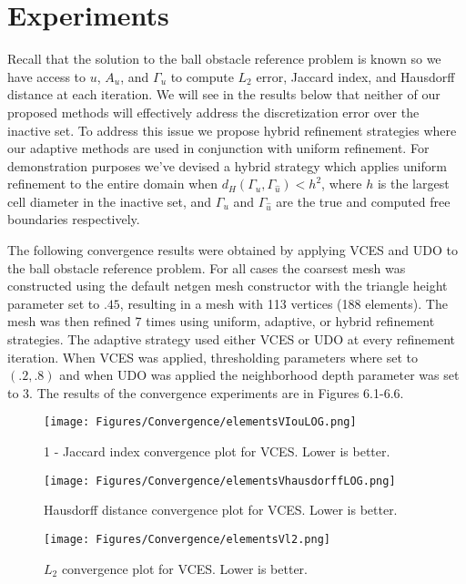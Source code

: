 \documentclass[12 pt]{report}
\begin{document}
\section{Experiments}
Recall that the solution to the ball obstacle reference problem is known so we have access to $u$, $A_u$, and $\Gamma_u$ to compute $L_2$ error, Jaccard index, and Hausdorff distance at each iteration. We will see in the results below that neither of our proposed methods will effectively address the discretization error over the inactive set. To address this issue we propose hybrid refinement strategies where our adaptive methods are used in conjunction with uniform refinement. For demonstration purposes we've devised a hybrid strategy which applies uniform refinement to the entire domain when $d_H(\Gamma_u, \Gamma_{\hat{u}}) < h^2$, where $h$ is the largest cell diameter in the inactive set, and $\Gamma_u$ and $\Gamma_{\hat{u}}$ are the true and computed free boundaries respectively. 

The following convergence results were obtained by applying VCES and UDO to the ball obstacle reference problem. For all cases the coarsest mesh was constructed using the default netgen mesh constructor with the triangle height parameter set to $.45$, resulting in a mesh with 113 vertices (188 elements). The mesh was then refined 7 times using uniform, adaptive, or hybrid refinement strategies. The adaptive strategy used either VCES or UDO at every refinement iteration. When VCES was applied, thresholding parameters where set to $(.2, .8)$ and when UDO was applied the neighborhood depth parameter was set to $3$. The results of the convergence experiments are in Figures 6.1-6.6.


\begin{figure}[H]
  \centering
  \texttt{[image: Figures/Convergence/elementsVIouLOG.png]}
  \caption{1 - Jaccard index convergence plot for VCES. Lower is better.} 
\end{figure} 



\begin{figure}[H]
  \centering
  \texttt{[image: Figures/Convergence/elementsVhausdorffLOG.png]}
  \caption{Hausdorff distance convergence plot for VCES. Lower is better.} 
\end{figure} 


\begin{figure}[H]
  \centering
  \texttt{[image: Figures/Convergence/elementsVl2.png]}
  \caption{$L_2$ convergence plot for VCES. Lower is better.} 
\end{figure} 
\end{document}
